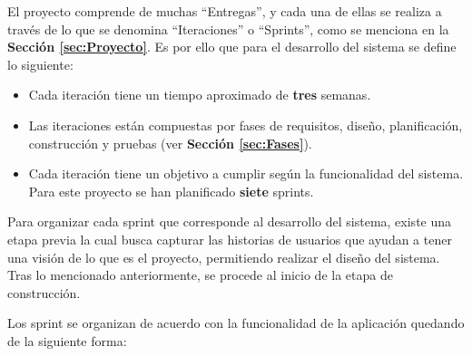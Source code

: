 El proyecto comprende de muchas ``Entregas'', y cada una de ellas se realiza a través de lo que se denomina ``Iteraciones'' o ``Sprints'', como se menciona en la \textbf{Sección \ref{sec:Proyecto}}. Es por ello que para el desarrollo del sistema se define lo siguiente:

\begin{itemize}
    \item Cada iteración tiene un tiempo aproximado de \textbf{tres} semanas.
    \item Las iteraciones están compuestas por fases de requisitos, diseño, planificación, construcción y pruebas (ver \textbf{Sección \ref{sec:Fases}}).
    \item Cada iteración tiene un objetivo a cumplir según la funcionalidad del sistema. Para este proyecto se han planificado \textbf{siete} sprints.
\end{itemize}

Para organizar cada sprint que corresponde al desarrollo del sistema, existe una etapa previa la cual busca capturar las historias de usuarios que ayudan a tener una visión de lo que es el proyecto, permitiendo realizar el diseño del sistema. Tras lo mencionado anteriormente, se procede al inicio de la etapa de construcción.

Los sprint se organizan de acuerdo con la funcionalidad de la aplicación quedando de la siguiente forma:

